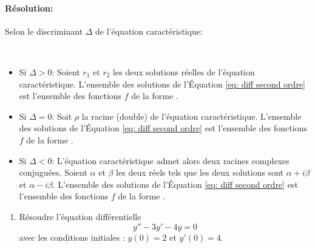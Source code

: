             \paragraph{R\'esolution:}
                  Selon le discriminant $\Delta$ de l'\'equation caract\'eristique: \\
                  \noindent
	                        \begin{thm} ~ 
                              \begin{itemize} 
                              \item Si $\Delta > 0$: 
                                    Soient $r_1$ et $r_2$ les deux solutions r\'eelles de l'\'equation caract\'eristique. 
                                    L'ensemble des solutions de l'\'Equation \ref{eq: diff second ordre} est 
                                    l'ensemble des fonctions $f$ de la forme
                                    .
                              \item Si $\Delta = 0$: Soit $\rho$ la racine (double) de l'\'equation caract\'eristique.
                                    L'ensemble des solutions de l'\'Equation \ref{eq: diff second ordre} est 
                                    l'ensemble des fonctions $f$ de la forme
	                                    .
                              \item Si $\Delta < 0$: 
                                    L'\'equation caract\'eristique admet alors deux racines complexes conjugu\'ees.
                                    Soient $\alpha$ et $\beta$ les deux r\'eels tels que 
                                    les deux solutions sont $\alpha + i \beta$ et $\alpha - i \beta$.
                                    L'ensemble des solutions de l'\'Equation \ref{eq: diff second ordre} est 
                                    l'ensemble des fonctions $f$ de la forme
                                    .
                              \end{itemize}
	                        \end{thm}
            \begin{ex}
                  \begin{enumerate}
                  \item R\'esoudre l'\'equation diff\'erentielle 
                        \begin{equation}
                        \label{eq:ex:eq diff 1}
                              y'' - 3 y' - 4 y = 0
                        \end{equation}
                  avec les conditions initiales : $y(0) = 2 $ et $y'(0) = 4$.
                  \end{enumerate}
            \end{ex}

